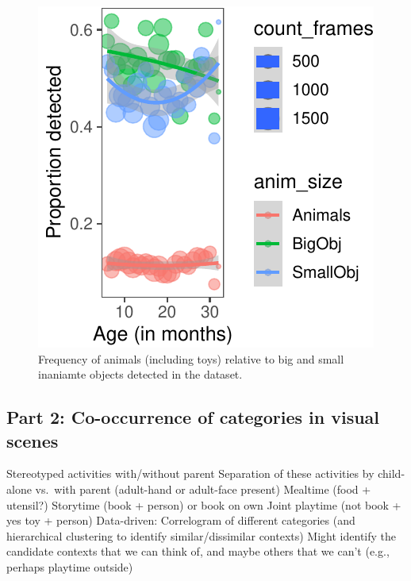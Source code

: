 \documentclass[10pt, letterpaper]{article}
\newenvironment{CodeChunk}{}{}
\begin{document}
\begin{CodeChunk}
\begin{figure}[h]

{\centering \includegraphics{figs/anim_size-1} 

}

\caption[Frequency of animals (including toys) relative to big and small inaniamte objects detected in the dataset]{Frequency of animals (including toys) relative to big and small inaniamte objects detected in the dataset.}\label{fig:anim_size}
\end{figure}
\end{CodeChunk}

\hypertarget{part-2-co-occurrence-of-categories-in-visual-scenes}{%
\subsection{Part 2: Co-occurrence of categories in visual
scenes}\label{part-2-co-occurrence-of-categories-in-visual-scenes}}

Stereotyped activities with/without parent Separation of these
activities by child-alone vs.~with parent (adult-hand or adult-face
present) Mealtime (food + utensil?) Storytime (book + person) or book on
own Joint playtime (not book + yes toy + person) Data-driven:
Correlogram of different categories (and hierarchical clustering to
identify similar/dissimilar contexts) Might identify the candidate
contexts that we can think of, and maybe others that we can't (e.g.,
perhaps playtime outside)
\end{document}
